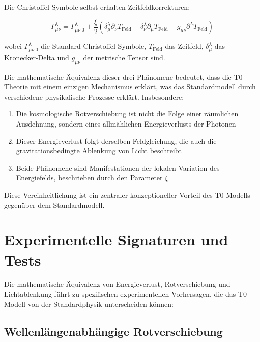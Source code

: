\documentclass[12pt,a4paper]{article}
\newcommand{\tfield}{T_{\text{Feld}}}
\theoremstyle{definition}
\begin{document}
	Die Christoffel-Symbole selbst erhalten Zeitfeldkorrekturen:
	
	\begin{equation}
		\Gamma^\lambda_{\mu\nu} = \Gamma^\lambda_{\mu\nu|0} + \frac{\xi}{2} \left(\delta^\lambda_\mu \partial_\nu \tfield + \delta^\lambda_\nu \partial_\mu \tfield - g_{\mu\nu} \partial^\lambda \tfield\right)
	\end{equation}
	
	wobei $\Gamma^\lambda_{\mu\nu|0}$ die Standard-Christoffel-Symbole, $\tfield$ das Zeitfeld, $\delta^\lambda_\mu$ das Kronecker-Delta und $g_{\mu\nu}$ der metrische Tensor sind.
	
	\begin{wichtig}
		Die mathematische Äquivalenz dieser drei Phänomene bedeutet, dass die T0-Theorie mit einem einzigen Mechanismus erklärt, was das Standardmodell durch verschiedene physikalische Prozesse erklärt. Insbesondere:
		
		\begin{enumerate}
			\item Die kosmologische Rotverschiebung ist nicht die Folge einer räumlichen Ausdehnung, sondern eines allmählichen Energieverlusts der Photonen
			\item Dieser Energieverlust folgt derselben Feldgleichung, die auch die gravitationsbedingte Ablenkung von Licht beschreibt
			\item Beide Phänomene sind Manifestationen der lokalen Variation des Energiefelds, beschrieben durch den Parameter $\xi$
		\end{enumerate}
		
		Diese Vereinheitlichung ist ein zentraler konzeptioneller Vorteil des T0-Modells gegenüber dem Standardmodell.
	\end{wichtig}
	
	\section{Experimentelle Signaturen und Tests}
	
	Die mathematische Äquivalenz von Energieverlust, Rotverschiebung und Lichtablenkung führt zu spezifischen experimentellen Vorhersagen, die das T0-Modell von der Standardphysik unterscheiden können:
	
	\subsection{Wellenlängenabhängige Rotverschiebung}
	
\end{document}
